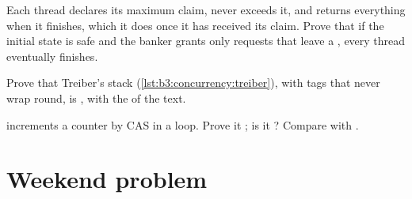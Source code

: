 \begin{exercise}[$\star\star\star$]\label{exo:b3:concurrency:10}
Each thread declares its maximum claim, never exceeds it, and returns everything when it finishes, which it does once it has received its claim. Prove that if the initial state is safe and the banker grants only requests that leave a , every thread eventually finishes.
\end{exercise}

\begin{exercise}[$\star\star\star$]\label{exo:b3:concurrency:11}
Prove that Treiber's stack (\cref{lst:b3:concurrency:treiber}), with tags that never wrap round, is , with the  of the text.
\end{exercise}

\begin{exercise}[$\star\star\star$]\label{exo:b3:concurrency:12}
 increments a counter by CAS in a loop. Prove it ; is it ? Compare with .
\end{exercise}

\section{Weekend problem}\label{sec:b3:concurrency:problem}

